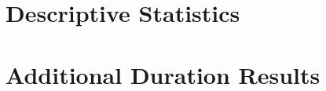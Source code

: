 \documentclass[12pt,letterpaper]{article}
\begin{document}
\clearpage

\onehalfspacing






\clearpage
\newpage

\appendix

\renewcommand\thefigure{\thesection.\arabic{figure}}    
\renewcommand\thetable{\thesection.\arabic{table}}    

\section{Descriptive Statistics}
\setcounter{figure}{0}
\setcounter{table}{0}
  


\clearpage

\section{Additional Duration Results}

\setcounter{figure}{0}
\setcounter{table}{0}







\clearpage
\end{document}
